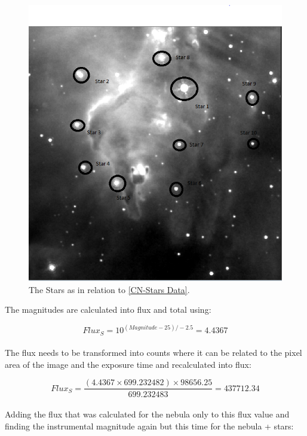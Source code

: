 \documentclass[12pt]{article}
\begin{document}
\begin{figure}[H]
\centering
\includegraphics[scale=0.55]{Images/AsImages/CN/StarsE.PNG}
\caption{The Stars as in relation to \cref{CN-Stars Data}.}
\label{CarinaE}
\end{figure}

The magnitudes are calculated into flux and total using:

\begin{equation}
Flux_S = 10^{(Magnitude-25)/-2.5} = 4.4367
\end{equation} \\

The flux needs to be transformed into counts where it can be related to the pixel area of the image and the exposure time and recalculated into flux:

\begin{equation}
Flux_S = \dfrac{(4.4367 \times 699.232482)\times 98656.25}{699.232483} = 437712.34
\end{equation} \\

Adding the flux that was calculated for the nebula only to this flux value and finding the instrumental magnitude again but this time for the nebula + stars:
\end{document}

